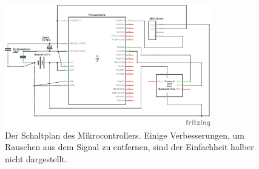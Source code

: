 \begin{figure}[H]
\centering
\includegraphics[width=0.8\textwidth]{pics/mikrocontroller_schaltplan.png}
\caption{Der Schaltplan des Mikrocontrollers. Einige Verbesserungen, um Rauschen aus dem Signal zu entfernen, sind der Einfachheit halber nicht dargestellt.}
\label{fig:mikrocontroller}
\end{figure}